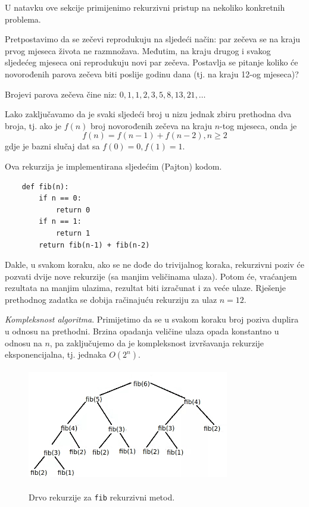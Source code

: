 U natavku ove sekcije primijenimo rekurzivni pristup na nekoliko konkretnih problema. 

\begin{example}
  
	Pretpostavimo da se zečevi reprodukuju na sljedeći način: par zečeva se na kraju prvog mjeseca života ne razmnožava. Međutim, na kraju drugog i svakog sljedećeg mjeseca oni reprodukuju novi par zečeva. Postavlja se pitanje koliko će novorođenih parova zečeva biti poslije godinu dana (tj. na kraju 12-og mjeseca)?
\end{example}

\begin{solution}
	 
	
	Brojevi parova zečeva čine niz: $0, 1,1, 2,3,5,8,13, 21, \ldots$ 
	
	Lako zaključavamo da je svaki sljedeći broj u nizu jednak zbiru prethodna dva broja, tj. ako je $f(n)$ broj  novorođenih zečeva na kraju $n$-tog mjeseca, onda je 
	$$f(n) = f(n-1) + f(n-2), n \geq 2$$
	gdje je bazni slučaj dat sa $f(0)= 0, f(1) = 1$.
\end{solution}

Ova rekurzija je implementirana sljedećim (Pajton) kodom.

\begin{verbatim}
	def fib(n):
		if n == 0:
			return 0
		if n == 1:
			return 1
		return fib(n-1) + fib(n-2)
\end{verbatim}

Dakle, u svakom koraku, ako se ne dođe do trivijalnog koraka, rekurzivni poziv će pozvati dvije nove rekurzije (sa manjim veličinama ulaza). Potom će, vraćanjem rezultata na manjim ulazima, rezultat biti izračunat i za veće ulaze. Rješenje prethodnog zadatka se dobija račinajuću rekurziju za ulaz $n=12$. 

\textit{Kompleksnost algoritma}. Primijetimo da se u svakom koraku broj poziva duplira u odnosu na prethodni. Brzina opadanja veličine ulaza opada konstantno u odnosu na $n$, pa zaključujemo da je kompleksnost izvršavanja rekurzije eksponencijalna, tj. jednaka $O(2^n)$.

\begin{figure}[H]
	\centering
	\includegraphics[width=250pt,height=140pt]{slike/fib_rec.jpeg} 
	\label{fig:rec_fib}
	\caption{Drvo rekurzije za \texttt{fib} rekurzivni metod.}
\end{figure}



